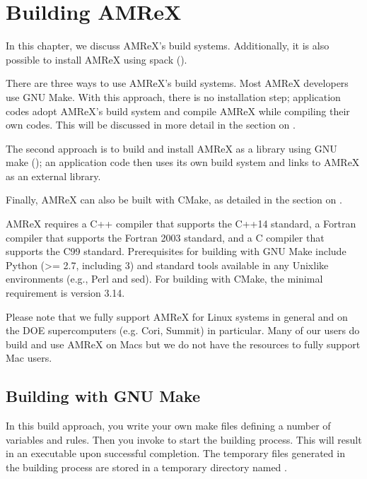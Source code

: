 \documentclass[letterpaper,10pt,english]{sphinxmanual}
\begin{document}
\chapter{Building AMReX}
\label{\detokenize{BuildingAMReX_Chapter:building-amrex}}\label{\detokenize{BuildingAMReX_Chapter:chap-buildingamrex}}\label{\detokenize{BuildingAMReX_Chapter::doc}}
\sphinxAtStartPar
In this chapter, we discuss AMReX’s build systems.  Additionally, it
is also possible to install AMReX using spack ().

\sphinxAtStartPar
There are three ways to use AMReX’s build systems. Most AMReX
developers use GNU Make. With this approach, there is no installation
step; application codes adopt AMReX’s build system and compile AMReX
while compiling their own codes. This will be discussed in more detail
in the section on {\hyperref[\detokenize{BuildingAMReX:sec-build-make}]{}}.

\sphinxAtStartPar
The second approach is to build and install AMReX as a library using GNU make ({\hyperref[\detokenize{BuildingAMReX:sec-build-lib}]{}});
an application code then uses its own build system and links to AMReX as an external library.

\sphinxAtStartPar
Finally, AMReX can also be built with CMake, as detailed in the section on {\hyperref[\detokenize{BuildingAMReX:sec-build-cmake}]{}}.

\sphinxAtStartPar
AMReX requires a C++ compiler that supports the C++14 standard, a
Fortran compiler that supports the Fortran 2003 standard, and a C
compiler that supports the C99 standard.  Prerequisites for building
with GNU Make include Python (\textgreater{}= 2.7, including 3) and standard tools
available in any Unix\sphinxhyphen{}like environments (e.g., Perl and sed).  For
building with CMake, the minimal requirement is version 3.14.

\sphinxAtStartPar
Please note that we fully support AMReX for Linux systems in general and on the
DOE supercomputers (e.g. Cori, Summit) in particular.  Many of our users do build
and use AMReX on Macs but we do not have the resources to fully support Mac users.


\section{Building with GNU Make}
\label{\detokenize{BuildingAMReX:building-with-gnu-make}}\label{\detokenize{BuildingAMReX:sec-build-make}}\label{\detokenize{BuildingAMReX::doc}}
\sphinxAtStartPar
In this build approach, you write your own make files defining a number of
variables and rules. Then you invoke   to start the building process.
This will result in an executable upon successful completion. The temporary
files generated in the building process are stored in a temporary directory
named  .
\end{document}
